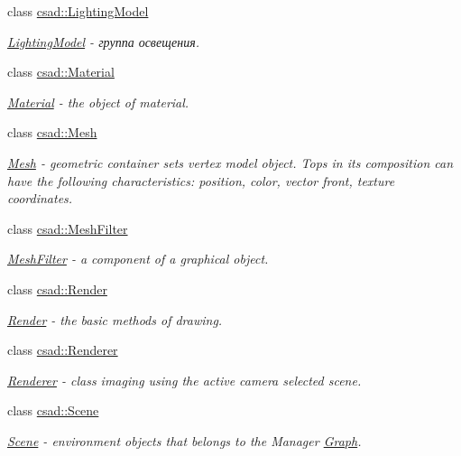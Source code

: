 \begin{DoxyCompactItemize}
class \hyperlink{classcsad_1_1_lighting_model}{csad\-::\-Lighting\-Model}
\begin{DoxyCompactList}\small\item\em \hyperlink{classcsad_1_1_lighting_model}{Lighting\-Model} -\/ группа освещения. \end{DoxyCompactList}\item 
class \hyperlink{classcsad_1_1_material}{csad\-::\-Material}
\begin{DoxyCompactList}\small\item\em \hyperlink{classcsad_1_1_material}{Material} -\/ the object of material. \end{DoxyCompactList}\item 
class \hyperlink{classcsad_1_1_mesh}{csad\-::\-Mesh}
\begin{DoxyCompactList}\small\item\em \hyperlink{classcsad_1_1_mesh}{Mesh} -\/ geometric container sets vertex model object. Tops in its composition can have the following characteristics\-: position, color, vector front, texture coordinates. \end{DoxyCompactList}\item 
class \hyperlink{classcsad_1_1_mesh_filter}{csad\-::\-Mesh\-Filter}
\begin{DoxyCompactList}\small\item\em \hyperlink{classcsad_1_1_mesh_filter}{Mesh\-Filter} -\/ a component of a graphical object. \end{DoxyCompactList}\item 
class \hyperlink{classcsad_1_1_render}{csad\-::\-Render}
\begin{DoxyCompactList}\small\item\em \hyperlink{classcsad_1_1_render}{Render} -\/ the basic methods of drawing. \end{DoxyCompactList}\item 
class \hyperlink{classcsad_1_1_renderer}{csad\-::\-Renderer}
\begin{DoxyCompactList}\small\item\em \hyperlink{classcsad_1_1_renderer}{Renderer} -\/ class imaging using the active camera selected scene. \end{DoxyCompactList}\item 
class \hyperlink{classcsad_1_1_scene}{csad\-::\-Scene}
\begin{DoxyCompactList}\small\item\em \hyperlink{classcsad_1_1_scene}{Scene} -\/ environment objects that belongs to the Manager \hyperlink{classcsad_1_1_graph}{Graph}. \end{DoxyCompactList}\item 

\end{DoxyCompactItemize}
